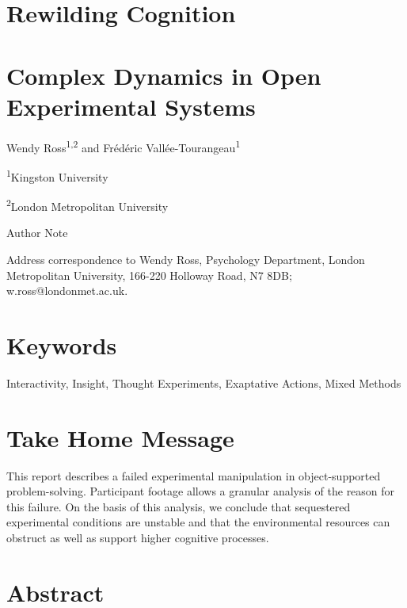 \documentclass{article}
\begin{document}
  











\section{Rewilding Cognition}

\section{Complex Dynamics in Open Experimental Systems}





Wendy Ross\textsuperscript{1,2} and Frédéric Vallée-Tourangeau\textsuperscript{1}



\textsuperscript{1}Kingston University

\textsuperscript{2}London Metropolitan University







Author Note

Address correspondence to Wendy Ross, Psychology Department, London Metropolitan University, 166-220 Holloway Road, N7 8DB; w.ross@londonmet.ac.uk. 



\section{Keywords }

Interactivity, Insight, Thought Experiments, Exaptative Actions, Mixed Methods

\section{Take Home Message }

This report describes a failed experimental manipulation in object-supported problem-solving. Participant footage allows a granular analysis of the reason for this failure. On the basis of this analysis, we conclude that sequestered experimental conditions are unstable and that the environmental resources can obstruct as well as support higher cognitive processes. 

\section{Abstract}
\end{document}
